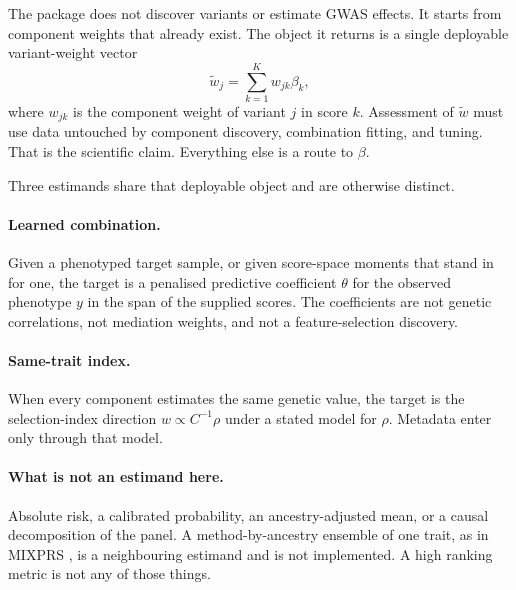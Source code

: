 \documentclass[11pt,a4paper]{article}
\begin{document}
The package does not discover variants or estimate GWAS effects.
It starts from component weights that already exist. The object
it returns is a single deployable variant-weight vector
\begin{equation}
  \widetilde w_j=\sum_{k=1}^{K}w_{jk}\beta_k,
  \label{eq:combined-weights}
\end{equation}
where \(w_{jk}\) is the component weight of variant \(j\) in
score \(k\). Assessment of \(\widetilde w\) must use data
untouched by component discovery, combination fitting, and
tuning. That is the scientific claim. Everything else is a route
to \(\beta\).

Three estimands share that deployable object and are otherwise
distinct.

\paragraph{Learned combination.}
Given a phenotyped target sample, or given score-space moments
that stand in for one, the target is a penalised predictive
coefficient \(\theta\) for the observed phenotype \(y\) in the
span of the supplied scores. The coefficients are not genetic
correlations, not mediation weights, and not a feature-selection
discovery.

\paragraph{Same-trait index.}
When every component estimates the same genetic value, the
target is the selection-index direction \(w\propto C^{-1}\rho\)
under a stated model for \(\rho\). Metadata enter only through
that model.

\paragraph{What is not an estimand here.}
Absolute risk, a calibrated probability, an ancestry-adjusted
mean, or a causal decomposition of the panel. A
method-by-ancestry ensemble of one trait, as in MIXPRS
\cite{xu2026}, is a neighbouring estimand and is not implemented.
A high ranking metric is not any of those things.
\end{document}
